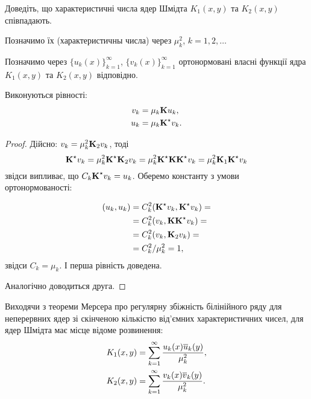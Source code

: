 \begin{problem}
    Доведіть, що характеристичні числа ядер Шмідта $K_1(x, y)$ та $K_2(x, y)$ співпадають.
\end{problem}

Позначимо їх (характеристичны числа) через $\mu_k^2$, $k=1,2,\ldots$ \medskip

Позначимо через $\{u_k(x)\}_{k=1}^\infty$, $\{v_k(x)\}_{k=1}^\infty$ ортонормовані власні функції ядра $K_1(x,y)$ та $K_2(x,y)$ відповідно. \medskip

\begin{proposition}
	\label{proposition:2.6.3}
	Виконуються рівності:
	\begin{align}
		v_k&=\mu_k\bf{K}u_k, \\
		u_k&=\mu_k\bf{K}^\star v_k.
	\end{align}
\end{proposition}

\begin{proof}
	Дійсно: $v_k=\mu_k^2\bf{K}_2v_k$, тоді
	\begin{equation}
		\bf{K}^\star v_k=\mu_k^2\bf{K}^\star \bf{K}_2v_k=\mu_k^2\bf{K}^\star \bf{K}\bf{K}^\star v_k=\mu_k^2\bf{K}_1\bf{K}^\star v_k
	\end{equation}
	звідси випливає, що $C_k\bf{K}^\star v_k=u_k$. Оберемо константу з умови ортонормованості:

	\begin{equation}
		\begin{aligned}
		(u_k, u_k) &= C_k^2 (\bf{K}^\star v_k, \bf{K}^\star v_k)=\\
		&=C_k^2(v_k,\bf{K}\bf{K}^\star v_k)=\\
		&=C_k^2(v_k,\bf{K}_2v_k)=\\\
		&=C_k^2/\mu_k^2=1,
		\end{aligned}
	\end{equation}
	звідси $C_k = \mu_k$. І перша рівність доведена. \medskip

	Аналогічно доводиться друга.
\end{proof}

Виходячи з теореми Мерсера про регулярну збіжність білінійного ряду для неперервних ядер зі скінченою кількістю від'ємних характеристичних чисел, для ядер Шмідта має місце відоме розвинення:
\begin{align}
	K_1(x,y)&=\Sum_{k=1}^\infty \dfrac{u_k(x)\overline u_k(y)}{\mu_k^2}, \\
	K_2(x,y)&=\Sum_{k=1}^\infty \dfrac{v_k(x)\overline v_k(y)}{\mu_k^2}.
\end{align}

